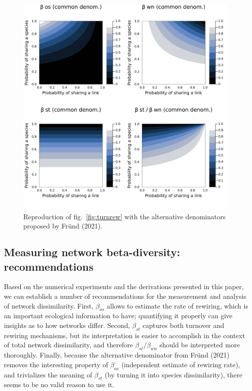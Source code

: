 \documentclass[10pt,oneside]{article}
\makeatletter
\def\maxwidth{\ifdim\Gin@nat@width>\linewidth\linewidth
\else\Gin@nat@width\fi}
\let\Oldincludegraphics\includegraphics
\renewcommand{\includegraphics}[1]{\Oldincludegraphics[width=\maxwidth]{#1}}
\makeatother
\begin{document}
\begin{figure}
\hypertarget{fig:commden}{%
\centering
\includegraphics{figures/common_denominator/components.png}
\caption{Reproduction of fig.~\ref{fig:turnrew} with the alternative
denominators proposed by Fründ (2021).}\label{fig:commden}
}
\end{figure}

\hypertarget{measuring-network-beta-diversity-recommendations}{%
\subsection{Measuring network beta-diversity:
recommendations}\label{measuring-network-beta-diversity-recommendations}}

Based on the numerical experiments and the derivations presented in this
paper, we can establish a number of recommendations for the measurement
and analysis of network dissimilarity. First, \(\beta_{os}\) allows to
estimate the rate of rewiring, which is an important ecological
information to have; quantifying it properly can give insights as to how
networks differ. Second, \(\beta_{st}\) captures both turnover and
rewiring mechanisms, but its interpretation is easier to accomplish in
the context of total network dissimilarity, and therefore
\(\beta_{st}/\beta_{wn}\) should be interpreted more thoroughly.
Finally, because the alternative denominator from Fründ (2021) removes
the interesting property of \(\beta_{os}\) (independent estimate of
rewiring rate), and trivializes the meaning of \(\beta_{st}\) (by
turning it into species dissimilarity), there seems to be no valid
reason to use it.
\end{document}
